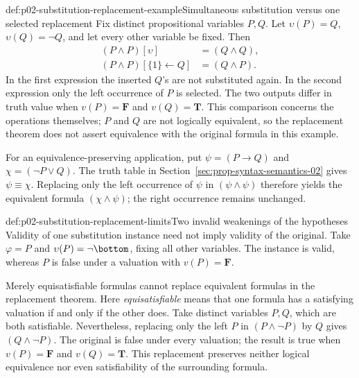 \begin{hbexample}{def:p02-substitution-replacement-example}{Simultaneous substitution versus one selected replacement}
Fix distinct propositional variables \(P,Q\).  Let
\(\upsilon(P)=Q\), \(\upsilon(Q)=\neg Q\), and let every other variable be
fixed.  Then
\[
\begin{aligned}
 (P\land P)[\upsilon]&=(Q\land Q),\\
 (P\land P)[\{1\}\leftarrow Q]&=(Q\land P).
\end{aligned}
\]
In the first expression the inserted \(Q\)'s are not substituted again.
In the second expression only the left occurrence of \(P\) is selected.
The two outputs differ in truth value when \(v(P)=\mathbf F\) and
\(v(Q)=\mathbf T\).  This comparison concerns the operations themselves;
\(P\) and \(Q\) are not logically equivalent, so the replacement theorem does
not assert equivalence with the original formula in this example.

For an equivalence-preserving application, put
\(\psi=(P\to Q)\) and \(\chi=(\neg P\lor Q)\).
The truth table in Section~\ref{sec:prop-syntax-semantics-02} gives
\(\psi\equiv\chi\).  Replacing only the left occurrence of \(\psi\) in
\((\psi\land\psi)\) therefore yields the equivalent formula
\((\chi\land\psi)\); the right occurrence remains unchanged.
\end{hbexample}

\begin{hbexample}{def:p02-substitution-replacement-limits}{Two invalid weakenings of the hypotheses}
Validity of one substitution instance need not imply validity of the original.
Take \(\varphi=P\) and \(\upsilon(P)=\neg\bottom\), fixing all other
variables.  The instance is valid, whereas \(P\) is false under a valuation
with \(v(P)=\mathbf F\).

Merely equisatisfiable formulas cannot replace equivalent formulas in the
replacement theorem.  Here \emph{equisatisfiable} means that one formula has a
satisfying valuation if and only if the other does.  Take distinct variables
\(P,Q\), which are both satisfiable.  Nevertheless, replacing only the left \(P\) in
\((P\land\neg P)\) by \(Q\) gives \((Q\land\neg P)\).
The original is false under every valuation; the result is true when
\(v(P)=\mathbf F\) and \(v(Q)=\mathbf T\).  This replacement preserves neither
logical equivalence nor even satisfiability of the surrounding formula.
\end{hbexample}
